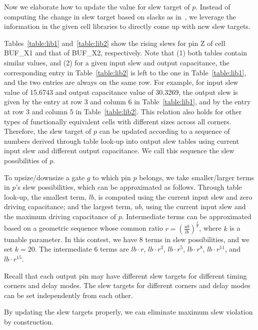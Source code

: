 Now we elaborate how to update the value for slew target of $p$. Instead of computing the change in slew target based on slacks as in~\cite{Held:Gate}, we leverage the information in the given cell libraries to directly come up with new slew targets.

Tables~\ref{table:lib1} and~\ref{table:lib2} show the rising slews for pin Z of cell BUF\_X1 and that of BUF\_X2, respectively. Note that (1) both tables contain similar values, and (2) for a given input slew and output capacitance, the corresponding entry in Table~\ref{table:lib2} is left to the one in Table~\ref{table:lib1}, and the two entries are always on the same row. For example, for input slew value of 15.6743 and output capacitance value of 30.3269, the output slew is given by the entry at row 3 and column 6 in Table~\ref{table:lib1}, and by the entry at row 3 and column 5 in Table~\ref{table:lib2}. This relation also holds for other types of functionally equivalent cells with different sizes across all corners. Therefore, the slew target of $p$ can be updated according to a sequence of numbers derived through table look-up into output slew tables using current input slew and different output capacitance. We call this sequence the slew possibilities of $p$.

To upsize/downsize a gate $g$ to which pin $p$ belongs, we take smaller/larger terms in $p$'s slew possibilities, which can be approximated as follows. Through table look-up, the smallest term, $lb$, is computed using the current input slew and zero driving capacitance; and the largest term, $ub$, using the current input slew and the maximum driving capacitance of $p$. Intermediate terms can be approximated based on a geometric sequence whose common ratio $r = (\frac{ub}{lb})^{\frac{1}{k}}$, where $k$ is a tunable parameter. In this contest, we have 8 terms in slew possibilities, and we set $k = 20$. The intermediate 6 terms are $lb\cdot r$, $lb\cdot r^3$, $lb\cdot r^5$, $lb\cdot r^8$, $lb\cdot r^{11}$, and $lb\cdot r^{15}$.

Recall that each output pin may have different slew targets for different timing corners and delay modes. The slew targets for different corners and delay modes can be set independently from each other.

By updating the slew targets properly, we can eliminate maximum slew violation by construction.

